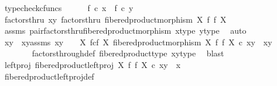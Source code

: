 \begin{isabellebody}
\ typecheck{\isacharunderscore}{\kern0pt}cfuncs\isanewline
\isanewline
\ \ \ \ \isamarkupfalse%
\ {\isachardoublequoteopen}f\ {\isasymcirc}\isactrlsub c\ x\ {\isacharequal}{\kern0pt}\ f\ {\isasymcirc}\isactrlsub c\ y{\isachardoublequoteclose}\isanewline
\ \ \ \ \isamarkupfalse%
\ \isamarkupfalse%
\ factorsthru{\isacharcolon}{\kern0pt}\ {\isachardoublequoteopen}{\isasymlangle}x{\isacharcomma}{\kern0pt}y{\isasymrangle}\ factorsthru\ fibered{\isacharunderscore}{\kern0pt}product{\isacharunderscore}{\kern0pt}morphism\ X\ f\ f\ X{\isachardoublequoteclose}\isanewline
\ \ \ \ \ \ \isamarkupfalse%
\ assms{\isacharparenleft}{\kern0pt}{}{\isacharparenright}{\kern0pt}\ pair{\isacharunderscore}{\kern0pt}factorsthru{\isacharunderscore}{\kern0pt}fibered{\isacharunderscore}{\kern0pt}product{\isacharunderscore}{\kern0pt}morphism\ x{\isacharunderscore}{\kern0pt}type{}\ y{\isacharunderscore}{\kern0pt}type{}\ \isamarkupfalse%
\ auto\isanewline
\ \ \ \ \isamarkupfalse%
\ \isamarkupfalse%
\ xy\ \ xy{\isacharunderscore}{\kern0pt}assms{\isacharcolon}{\kern0pt}\ {\isachardoublequoteopen}xy\ {\isacharcolon}{\kern0pt}\ {\isasymone}\ {\isasymrightarrow}\ X\ \isactrlbsub f\isactrlesub {\isasymtimes}\isactrlsub c\isactrlbsub f\isactrlesub \ X{\isachardoublequoteclose}\ {\isachardoublequoteopen}fibered{\isacharunderscore}{\kern0pt}product{\isacharunderscore}{\kern0pt}morphism\ X\ f\ f\ X\ {\isasymcirc}\isactrlsub c\ xy\ {\isacharequal}{\kern0pt}\ {\isasymlangle}x{\isacharcomma}{\kern0pt}y{\isasymrangle}{\isachardoublequoteclose}\isanewline
\ \ \ \ \ \ \isamarkupfalse%
\ factors{\isacharunderscore}{\kern0pt}through{\isacharunderscore}{\kern0pt}def{}\ fibered{\isacharunderscore}{\kern0pt}product{\isacharunderscore}{\kern0pt}type\ x{\isacharunderscore}{\kern0pt}y{\isacharunderscore}{\kern0pt}type\ \isamarkupfalse%
\ blast\isanewline
\isanewline
\ \ \ \ \isamarkupfalse%
\ left{\isacharunderscore}{\kern0pt}proj{\isacharcolon}{\kern0pt}\ {\isachardoublequoteopen}fibered{\isacharunderscore}{\kern0pt}product{\isacharunderscore}{\kern0pt}left{\isacharunderscore}{\kern0pt}proj\ X\ f\ f\ X\ {\isasymcirc}\isactrlsub c\ xy\ {\isacharequal}{\kern0pt}\ x{\isachardoublequoteclose}\isanewline
\ \ \ \ \ \ \isamarkupfalse%
\ fibered{\isacharunderscore}{\kern0pt}product{\isacharunderscore}{\kern0pt}left{\isacharunderscore}{\kern0pt}proj{\isacharunderscore}{\kern0pt}def\ \isamarkupfalse%

\end{isabellebody}

